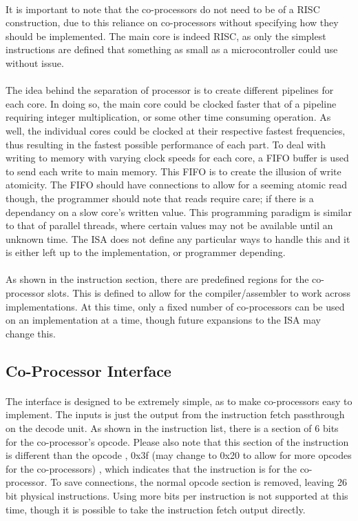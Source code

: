\documentclass[letterpaper, 11pt]{article}
\begin{document}
\paragraph{}It is important to note that the co-processors do not need to be of a RISC construction, due to this reliance on co-processors without
specifying how they should be implemented. The main core is indeed RISC, as only the simplest instructions are defined that something as small as a microcontroller
could use without issue.
\paragraph{}The idea behind the separation of processor is to create different pipelines for each core. In doing so, the main core could be clocked faster that of
a pipeline requiring integer multiplication, or some other time consuming operation. As well, the individual cores could be clocked at their respective 
fastest frequencies, thus resulting in the fastest possible performance of each part. To deal with writing to memory with varying clock speeds for each core,
a FIFO buffer is used to send each write to main memory. This FIFO is to create the illusion of write atomicity. The FIFO should have connections to allow
for a seeming atomic read though, the programmer should note that reads require care; if there is a dependancy on a slow core's written value. This programming 
paradigm is similar to that of parallel threads, where certain values may not be available until an unknown time. The ISA does not define any particular ways
to handle this and it is either left up to the implementation, or programmer depending.
\paragraph{}As shown in the instruction section, there are predefined regions for the co-processor slots. 
This is defined to allow for the compiler/assembler to work across implementations. At this time, only a fixed number of co-processors can be used on 
an implementation at a time, though future expansions to the ISA may change this.  

\subsection{Co-Processor Interface}
\paragraph{}The interface is designed to be extremely simple, as to make co-processors easy to implement. The inputs is just the output from the instruction fetch
passthrough on the decode unit. As shown in the instruction list, there is a section of 6 bits for the co-processor's opcode. Please also note
that this section of the instruction is different than the opcode , 0x3f (may change to 0x20 to allow for more opcodes for the co-processors) , which indicates that the instruction is for the co-processor. To save connections, 
the normal opcode section is removed, leaving 26 bit physical instructions. Using more bits per instruction is not supported at this time, though it is possible
to take the instruction fetch output directly. 
\end{document}
